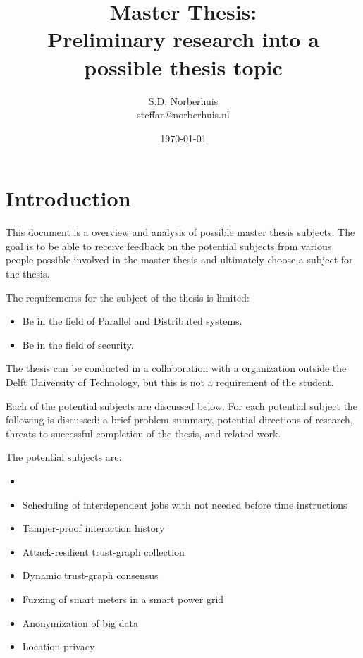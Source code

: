\documentclass{article}
\title{Master Thesis:\\ Preliminary research into a possible thesis topic}
\author{S.D. Norberhuis\\steffan@norberhuis.nl}
\date{\today}
\begin{document}
\maketitle

\tableofcontents

\section{Introduction}
This document is a overview and analysis of possible master thesis subjects.
The goal is to be able to receive feedback on the potential subjects from various people possible involved in the master thesis
and ultimately choose a subject for the thesis.

The requirements for the subject of the thesis is limited:
\begin{itemize}
\item Be in the field of Parallel and Distributed systems.
\item Be in the field of security.
\end{itemize}
The thesis can be conducted in a collaboration with a organization outside the Delft University of Technology,
but this is not a requirement of the student. 

Each of the potential subjects are discussed below.
For each potential subject the following is discussed: 
a brief problem summary, potential directions of research, threats to successful completion of the thesis, and related work.

The potential subjects are:
\begin{itemize}
	\item 	\item Scheduling of interdependent jobs with not needed before time instructions
	\item Tamper-proof interaction history
	\item Attack-resilient trust-graph collection
	\item Dynamic trust-graph consensus
	\item Fuzzing of smart meters in a smart power grid
	\item Anonymization of big data
	\item Location privacy
\end{itemize}





\end{document}
